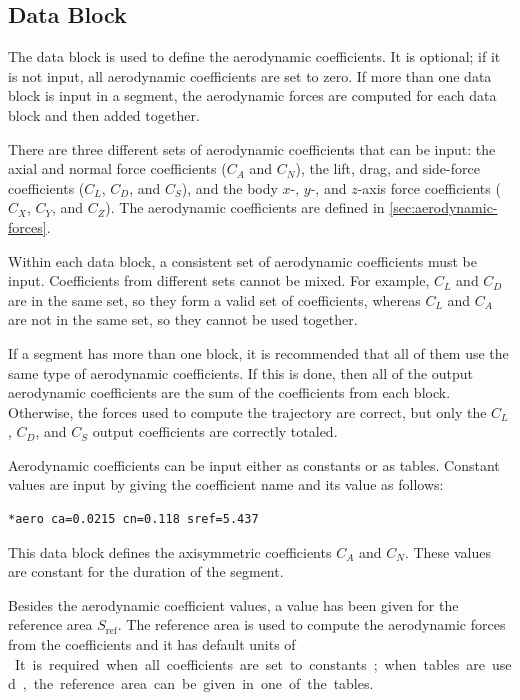 \subsection{ Data Block}\label{sec:block-aero}

The  data block is used to define the aerodynamic
coefficients. It is optional; if it is not input, all aerodynamic coefficients are set
to zero. If more than one  data block is input in a segment,
the aerodynamic forces are computed for each  data block and
then added together.

There are three different sets of aerodynamic coefficients that can be input: the
axial and normal force coefficients ($C_A$ and $C_N$), the lift, drag, and side-force
coefficients ($C_L$, $C_D$, and $C_S$), and the body $x$-, $y$-, and $z$-axis force
coefficients ($C_X$, $C_Y$, and $C_Z$). The aerodynamic coefficients are defined
in \cref{sec:aerodynamic-forces}.

Within each  data block, a consistent set of aerodynamic
coefficients must be input. Coefficients from different sets cannot be mixed. For
example, $C_L$ and $C_D$ are in the same set, so they form a valid set of
coefficients, whereas $C_L$ and $C_A$ are not in the same set, so they cannot be
used together.

If a segment has more than one  block, it is recommended
that all of them use the same type of aerodynamic coefficients. If this is done, then
all of the output aerodynamic coefficients are the sum of the coefficients from each
 block. Otherwise, the forces used to compute the trajectory
are correct, but only the $C_L$, $C_D$, and $C_S$ output coefficients are correctly
totaled.


Aerodynamic coefficients can be input either as constants or as tables. Constant
values are input by giving the coefficient name and its value as follows:

\begin{lstlisting}[style=taosmanual]
*aero ca=0.0215 cn=0.118 sref=5.437
\end{lstlisting}

This data block defines the axisymmetric coefficients $C_A$ and $C_N$. These
values are constant for the duration of the segment.

Besides the aerodynamic coefficient values, a value has been given for the reference
area $S_{\mathrm{ref}}$. The reference area is used to compute the aerodynamic
forces from the coefficients and it has default units of \si{\square\foot}. It is
required when all coefficients are set to constants; when tables are used, the
reference area can be given in one of the tables.

